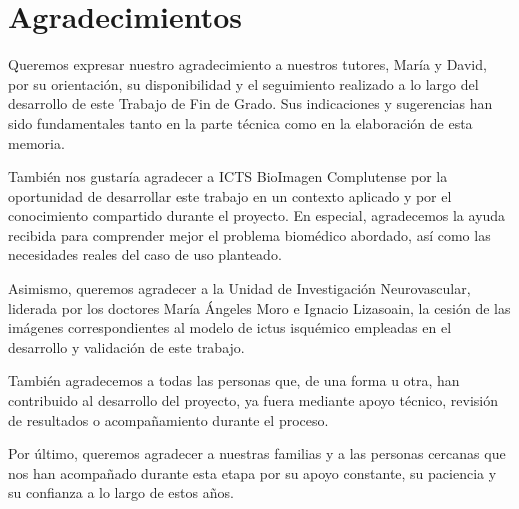 
\chapter*{Agradecimientos}

Queremos expresar nuestro agradecimiento a nuestros tutores, María y David, por su orientación, su disponibilidad y el seguimiento realizado a lo largo del desarrollo de este Trabajo de Fin de Grado. Sus indicaciones y sugerencias han sido fundamentales tanto en la parte técnica como en la elaboración de esta memoria.

También nos gustaría agradecer a ICTS BioImagen Complutense por la oportunidad de desarrollar este trabajo en un contexto aplicado y por el conocimiento compartido durante el proyecto. En especial, agradecemos la ayuda recibida para comprender mejor el problema biomédico abordado, así como las necesidades reales del caso de uso planteado.

Asimismo, queremos agradecer a la Unidad de Investigación Neurovascular, liderada por los doctores María Ángeles Moro e Ignacio Lizasoain, la cesión de las imágenes correspondientes al modelo de ictus isquémico empleadas en el desarrollo y validación de este trabajo.

También agradecemos a todas las personas que, de una forma u otra, han contribuido al desarrollo del proyecto, ya fuera mediante apoyo técnico, revisión de resultados o acompañamiento durante el proceso.

Por último, queremos agradecer a nuestras familias y a las personas cercanas que nos han acompañado durante esta etapa por su apoyo constante, su paciencia y su confianza a lo largo de estos años.











